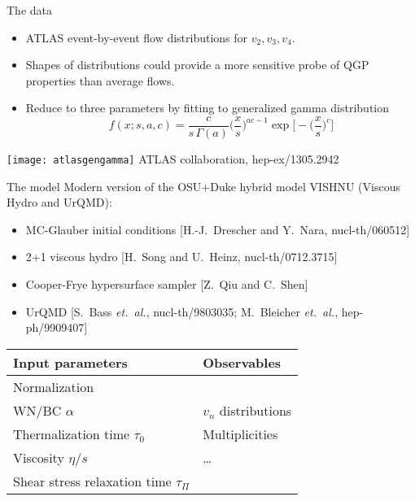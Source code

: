 \documentclass{beamer}
\begin{document}
\begin{frame}{The data}
  \begin{itemize}
    \item ATLAS event-by-event flow distributions for $v_2,v_3,v_4$.
    \item Shapes of distributions could provide a more sensitive probe of QGP properties than average flows.
    \item Reduce to three parameters by fitting to generalized gamma distribution
      \small
      \begin{equation*}
        f(x;s,a,c) = \frac{c}{s\,\Gamma(a)} \biggl( \frac{x}{s} \biggr)^{ac-1} \exp \biggl[ -\biggl( \frac{x}{s} \biggr)^c \biggr]
      \end{equation*}
  \end{itemize}

  \centering
  \texttt{[image: atlasgengamma]} %
  \flushright
  \tiny ATLAS collaboration, hep-ex/1305.2942
\end{frame}



\begin{frame}{The model}
  Modern version of the OSU+Duke hybrid model VISHNU (Viscous Hydro and UrQMD):
  \begin{itemize}
    \item MC-Glauber initial conditions {\tiny [H.-J.\ Drescher and Y.\ Nara, nucl-th/060512]}
    \item 2+1 viscous hydro {\tiny [H.\ Song and U.\ Heinz, nucl-th/0712.3715]}
    \item Cooper-Frye hypersurface sampler {\tiny [Z.\ Qiu and C.\ Shen]}
    \item UrQMD {\tiny [S.\ Bass \emph{et.\ al.}, nucl-th/9803035; M.\ Bleicher \emph{et.\ al.}, hep-ph/9909407]}
  \end{itemize}
  
  \vspace{.07\textheight}

  \centering
  \begin{tabular}{ll}
    \toprule
    Input parameters & Observables \\
    \midrule
    Normalization                           & \\
    WN/BC $\alpha$                          & $v_n$ distributions \\
    Thermalization time $\tau_0$            & Multiplicities \\
    Viscosity $\eta/s$                      & \ldots \\
    Shear stress relaxation time $\tau_\Pi$ & \\
    \bottomrule
  \end{tabular}

\end{frame}
\end{document}
